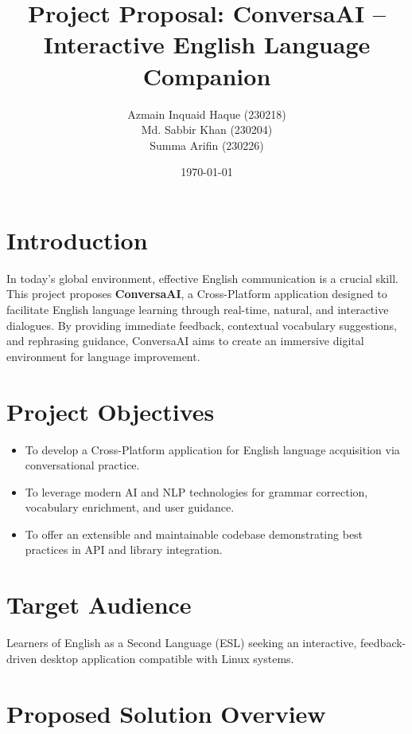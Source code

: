 \documentclass[12pt]{article}
\begin{document}
\title{Project Proposal: ConversaAI -- Interactive English Language Companion}
\author{
    Azmain Inquaid Haque (230218) \\
    Md. Sabbir Khan (230204) \\
    Summa Arifin (230226)
}
\date{\today}
\maketitle

\section*{Introduction}

In today’s global environment, effective English communication is a crucial skill. This project proposes \textbf{ConversaAI}, a Cross-Platform application designed to facilitate English language learning through real-time, natural, and interactive dialogues. By providing immediate feedback, contextual vocabulary suggestions, and rephrasing guidance, ConversaAI aims to create an immersive digital environment for language improvement.

\section*{Project Objectives}

\begin{itemize}
    \item To develop a Cross-Platform application for English language acquisition via conversational practice.
    \item To leverage modern AI and NLP technologies for grammar correction, vocabulary enrichment, and user guidance.
    \item To offer an extensible and maintainable codebase demonstrating best practices in API and library integration.
\end{itemize}

\section*{Target Audience}

Learners of English as a Second Language (ESL) seeking an interactive, feedback-driven desktop application compatible with Linux systems.

\section*{Proposed Solution Overview}
\end{document}
